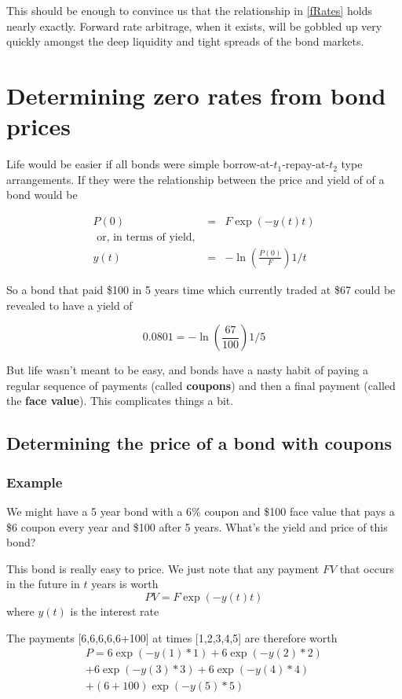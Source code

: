 This should be enough to convince us that the relationship in \ref{fRates} holds nearly exactly. Forward rate arbitrage, when it exists, will be gobbled up very quickly amongst the deep liquidity and tight spreads of the bond markets.

\section{Determining zero rates from bond prices}

Life would be easier if all bonds were simple borrow-at-$t_1$-repay-at-$t_2$ type arrangements. If they were the relationship between the price and yield of of a bond would be

\begin{eqnarray*}
P(0) &=& F\exp (-y(t)t)\\ \mbox{ or, in terms of yield, }\\
y(t) &=& -\ln \left( \frac{P(0)}{F} \right)1/t
\end{eqnarray*}

So a bond that paid \$100 in 5 years time which currently traded at \$67 could be revealed to have a yield of

\[0.0801 = -\ln \left( \frac{67}{100} \right)1/5\]

But life wasn't meant to be easy, and bonds have a nasty habit of paying a regular sequence of payments (called \textbf{coupons}) and then a final payment (called the \textbf{face value}). This complicates things a bit.

\subsection{Determining the price of a bond with coupons}

\subsubsection{Example}
We might have a 5 year bond with a 6\% coupon and \$100 face value that pays a \$6 coupon every year and \$100 after 5 years. What's the yield and price of this bond?

This bond is really easy to price. We just note that any payment $FV$ that occurs in the future in $t$ years is worth \[PV = F\exp(-y(t)t)  \]
where $y(t)$ is the interest rate

The payments [6,6,6,6,6+100] at times [1,2,3,4,5] are therefore worth
\begin{eqnarray*}P = 6\exp(-y(1)*1)+6\exp(-y(2)*2)\\+6\exp(-y(3)*3)+6\exp(-y(4)*4)\\+(6+100)\exp(-y(5)*5)\end{eqnarray*}

